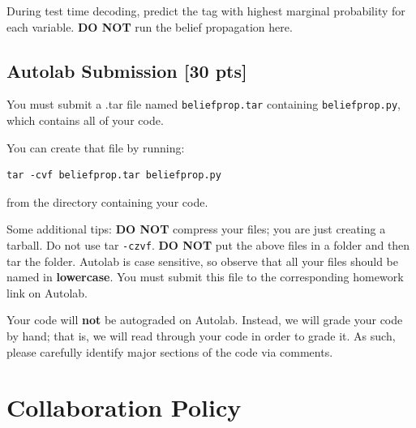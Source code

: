 \documentclass[11pt,addpoints,answers]{exam}
\numberwithin{equation}{section} %
\numberwithin{figure}{section} %
\numberwithin{table}{section} %
\newcommand{\pts}[1]{\textbf{[#1 pts]}}
\begin{document}
During test time decoding, predict the tag with highest marginal probability for each variable. \textbf{DO NOT} run the belief propagation here.



\subsection{Autolab Submission \pts{30}}
You must submit a .tar file named \lstinline{beliefprop.tar} containing \lstinline{beliefprop.py}, which contains all of your code.

You can create that file by running:
\begin{lstlisting}
tar -cvf beliefprop.tar beliefprop.py
\end{lstlisting}
from the directory containing your code.

Some additional tips: {\bf DO NOT} compress your files; you are just
creating a tarball. Do not use tar \texttt{-czvf}.  {\bf DO NOT} put
the above files in a folder and then tar the folder.  Autolab is case
sensitive, so observe that all your files should be named in {\bf
  lowercase}. You must submit this file to the corresponding homework
link on Autolab. 

Your code will \textbf{not} be autograded on Autolab. Instead, we will grade your code by hand; that is, we will read through your code in order to grade it. As such, please carefully identify major sections of the code via comments. 


\clearpage
\section{Collaboration Policy}
\end{document}
